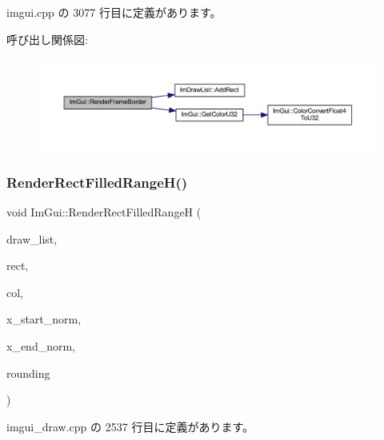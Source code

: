  imgui.\+cpp の 3077 行目に定義があります。

呼び出し関係図\+:\nopagebreak
\begin{figure}[H]
\begin{center}
\leavevmode
\includegraphics[width=350pt]{namespace_im_gui_adc76239c2006e66f8dab7638529a763d_cgraph}
\end{center}
\end{figure}
\mbox{\label{namespace_im_gui_af311762331bda4508b25e05f6afc7f45}} 
\subsubsection{\texorpdfstring{Render\+Rect\+Filled\+Range\+H()}{RenderRectFilledRangeH()}}
{\footnotesize\ttfamily void Im\+Gui\+::\+Render\+Rect\+Filled\+RangeH (\begin{DoxyParamCaption}\item[{\mbox{\hyperlink{struct_im_draw_list}{Im\+Draw\+List}} $\ast$}]{draw\+\_\+list,  }\item[{const \mbox{\hyperlink{struct_im_rect}{Im\+Rect}} \&}]{rect,  }\item[{\mbox{\hyperlink{imgui_8h_a118cff4eeb8d00e7d07ce3d6460eed36}{Im\+U32}}}]{col,  }\item[{float}]{x\+\_\+start\+\_\+norm,  }\item[{float}]{x\+\_\+end\+\_\+norm,  }\item[{float}]{rounding }\end{DoxyParamCaption})}



 imgui\+\_\+draw.\+cpp の 2537 行目に定義があります。

\mbox{\label{namespace_im_gui_a9971ce57f2a288ac3a12df886c5550d1}} 

